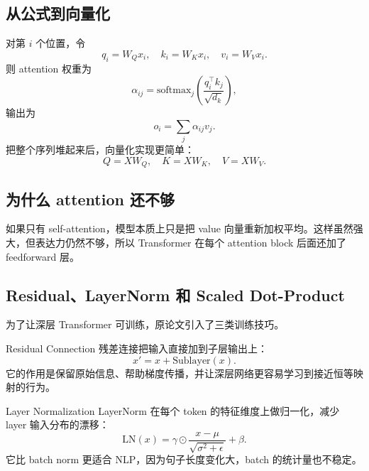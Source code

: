 \documentclass[a4paper]{article}
\begin{document}
\subsection{从公式到向量化}

对第 $i$ 个位置，令
\[
q_i = W_Q x_i,\quad k_i = W_K x_i,\quad v_i = W_V x_i.
\]
则 attention 权重为
\[
\alpha_{ij} = \mathrm{softmax}_j\!\left(\frac{q_i^\top k_j}{\sqrt{d_k}}\right),
\]
输出为
\[
o_i = \sum_j \alpha_{ij} v_j.
\]
把整个序列堆起来后，向量化实现更简单：
\[
Q = XW_Q,\quad K = XW_K,\quad V = XW_V.
\]









\subsection{为什么 attention 还不够}

如果只有 self-attention，模型本质上只是把 value 向量重新加权平均。这样虽然强大，但表达力仍然不够，所以 Transformer 在每个 attention block 后面还加了 feedforward 层。





\subsection{Residual、LayerNorm 和 Scaled Dot-Product}

为了让深层 Transformer 可训练，原论文引入了三类训练技巧。





\begin{knowledgebox}{Residual Connection}
残差连接把输入直接加到子层输出上：
\[
x' = x + \mathrm{Sublayer}(x).
\]
它的作用是保留原始信息、帮助梯度传播，并让深层网络更容易学习到接近恒等映射的行为。
\end{knowledgebox}

\begin{knowledgebox}{Layer Normalization}
LayerNorm 在每个 token 的特征维度上做归一化，减少 layer 输入分布的漂移：
\[
\mathrm{LN}(x) = \gamma \odot \frac{x - \mu}{\sqrt{\sigma^2 + \epsilon}} + \beta.
\]
它比 batch norm 更适合 NLP，因为句子长度变化大，batch 的统计量也不稳定。
\end{knowledgebox}
\end{document}
